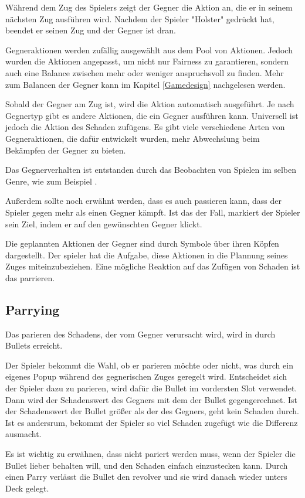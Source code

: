 Während dem Zug des Spielers zeigt der Gegner die Aktion an, die er in seinem nächsten Zug ausführen wird.
Nachdem der Spieler "Holster" gedrückt hat, beendet er seinen Zug und der Gegner ist dran.

Gegneraktionen werden zufällig ausgewählt aus dem Pool von Aktionen.
Jedoch wurden die Aktionen angepasst, um nicht nur Fairness zu garantieren,
sondern auch eine Balance zwischen mehr oder weniger anspruchsvoll zu finden.
Mehr zum Balancen der Gegner kann im Kapitel \ref{Gamedesign} nachgelesen werden.


Sobald der Gegner am Zug ist, wird die Aktion automatisch ausgeführt. Je nach Gegnertyp gibt es andere Aktionen,
die ein Gegner ausführen kann. Universell ist jedoch die Aktion des Schaden zufügens.
Es gibt viele verschiedene Arten von Gegneraktionen, die dafür entwickelt wurden, mehr Abwechslung beim Bekämpfen der Gegner zu bieten.

Das Gegnerverhalten ist entstanden durch das Beobachten von Spielen im selben Genre, wie zum Beispiel . 


Außerdem sollte noch erwähnt werden, dass es auch passieren kann, dass der Spieler gegen mehr als einen Gegner kämpft.
Ist das der Fall, markiert der Spieler sein Ziel, indem er auf den gewünschten Gegner klickt.



Die geplannten Aktionen der Gegner sind durch Symbole über ihren Köpfen dargestellt. Der spieler hat die Aufgabe,
diese Aktionen in die Plannung seines Zuges miteinzubeziehen. Eine mögliche Reaktion auf das Zufügen von Schaden ist das parrieren.


\subsection{Parrying}\label{parrying}
Das parieren des Schadens, der vom Gegner verursacht wird, wird in \FF durch Bullets erreicht.


Der Spieler bekommt die Wahl, ob er parieren möchte oder nicht, was durch ein eigenes Popup während des gegnerischen Zuges geregelt wird.
Entscheidet sich der Spieler dazu zu parieren, wird dafür die Bullet im vordersten Slot verwendet.
Dann wird der Schadenswert des Gegners mit dem der Bullet gegengerechnet. Ist der Schadenswert der Bullet größer als der des Gegners,
geht kein Schaden durch. Ist es andersrum, bekommt der Spieler so viel Schaden zugefügt wie die Differenz ausmacht.


Es ist wichtig zu erwähnen, dass nicht pariert werden muss, wenn der Spieler die Bullet lieber behalten will, und den Schaden einfach einzustecken kann.
Durch einen Parry verlässt die Bullet den revolver und sie wird danach wieder unters Deck gelegt.


